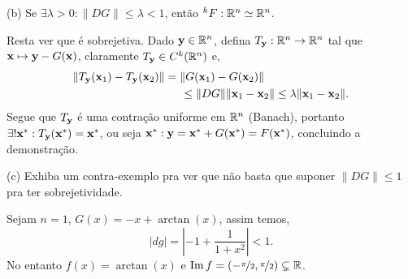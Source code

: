 (b) Se \(\exists \lambda > 0: \|DG\| \leq \lambda < 1 \), então \(^kF:\mathbb{R}^n \simeq \mathbb{R}^n\). 

\textcolor{gris}{
    Resta ver que é sobrejetiva. Dado \(\textbf{y} \in \mathbb{R}^n\), defina \(T_{\textbf{y}} : \mathbb{R}^n \to \mathbb{R}^n\) tal que \(\textbf{x} \mapsto \textbf{y} - G(\textbf{x}) \), claramente \(T_{\textbf{y}} \in C^k(\mathbb{R}^n)\) e, 
    \begin{align*}
        \|T_{\textbf{y}}(\textbf{x}_1) - T_{\textbf{y}}(\textbf{x}_2)\| &= \|G(\textbf{x}_1) - G(\textbf{x}_2)\| \\ 
        &\hspace{0.5cm}\leq \|DG\|\|\textbf{x}_1 - \textbf{x}_2\| \leq \lambda\|\textbf{x}_1 - \textbf{x}_2\|.
    \end{align*} 
    Segue que \(T_{\textbf{y}}\) é uma contração uniforme em \(\mathbb{R}^n\) (Banach), portanto \(\exists!\textbf{x}^* : T_{\textbf{y}} (\textbf{x}^*) = \textbf{x}^* \), ou seja \(\textbf{x}^*:   \textbf{y} = \textbf{x}^* + G(\textbf{x}^*) = F(\textbf{x}^*)\), concluindo a demonstração.  
}

(c) Exhiba um contra-exemplo pra ver que não basta que suponer \(\|DG\|\leq 1\) pra ter sobrejetividade. 

\textcolor{gris}{
    Sejam \(  n=1  \), \(G(x) = -x + \arctan (x)\), assim temos,  
    \[|dg| = \left|-1 + \frac{1}{1+x^2}\right| < 1.\]
    No entanto \(f(x) = \arctan(x) \) e \(\operatorname{Im}f = (-\nicefrac{\pi}{2}, \nicefrac{\pi}{2}) \subsetneq \mathbb{R}\). 
}